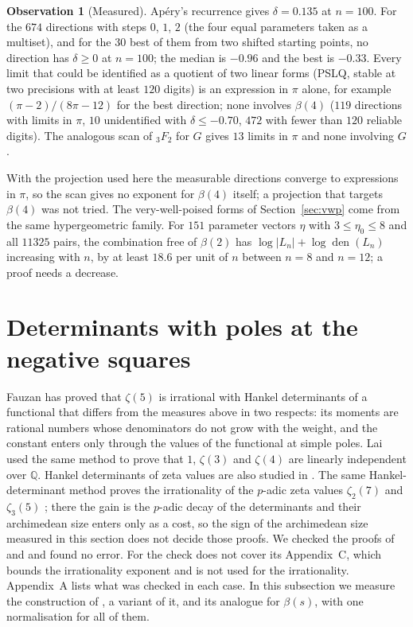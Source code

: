 \documentclass[11pt]{article}
\theoremstyle{definition}
\newtheorem{observation}[theorem]{Observation}
\begin{document}
\begin{observation}[Measured]\label{obs:cmf}
Ap\'ery's recurrence gives $\delta=0.135$ at $n=100$. For the $674$ directions with steps $0$, $1$, $2$ (the four equal parameters taken as a multiset), and for the $30$ best of them from two shifted starting points, no direction has $\delta\ge0$ at $n=100$; the median is $-0.96$ and the best is $-0.33$. Every limit that could be identified as a quotient of two linear forms (PSLQ, stable at two precisions with at least $120$ digits) is an expression in $\pi$ alone, for example $(\pi-2)/(8\pi-12)$ for the best direction; none involves $\beta(4)$ ($119$ directions with limits in $\pi$, $10$ unidentified with $\delta\le-0.70$, $472$ with fewer than $120$ reliable digits). The analogous scan of ${}_3F_2$ for $G$ gives $13$ limits in $\pi$ and none involving $G$.
\end{observation}

With the projection used here the measurable directions converge to expressions in $\pi$, so the scan gives no exponent for $\beta(4)$ itself; a projection that targets $\beta(4)$ was not tried. The very-well-poised forms of Section~\ref{sec:vwp} come from the same hypergeometric family. For $151$ parameter vectors $\eta$ with $3\le\eta_0\le8$ and all $11325$ pairs, the combination free of $\beta(2)$ has $\log|L_n|+\log\operatorname{den}(L_n)$ increasing with $n$, by at least $18.6$ per unit of $n$ between $n=8$ and $n=12$; a proof needs a decrease.


\section{Determinants with poles at the negative squares}\label{sec:fauzan}

Fauzan \cite{Fauzan} has proved that $\zeta(5)$ is irrational with Hankel determinants of a functional that differs from the measures above in two respects: its moments are rational numbers whose denominators do not grow with the weight, and the constant enters only through the values of the functional at simple poles. Lai \cite{Lai} used the same method to prove that $1$, $\zeta(3)$ and $\zeta(4)$ are linearly independent over $\mathbb Q$. Hankel determinants of zeta values are also studied in \cite{HZ,Zdet}. The same Hankel-determinant method proves the irrationality of the $p$-adic zeta values $\zeta_2(7)$ and $\zeta_3(5)$ \cite{Kilani}; there the gain is the $p$-adic decay of the determinants and their archimedean size enters only as a cost, so the sign of the archimedean size measured in this section does not decide those proofs. We checked the proofs of \cite{Fauzan} and \cite{Lai} and found no error. For \cite{Fauzan} the check does not cover its Appendix~C, which bounds the irrationality exponent and is not used for the irrationality. Appendix~A lists what was checked in each case. In this subsection we measure the construction of \cite{Fauzan}, a variant of it, and its analogue for $\beta(s)$, with one normalisation for all of them.
\end{document}

